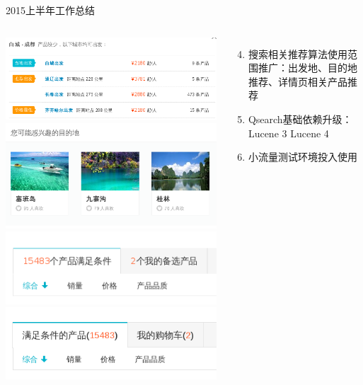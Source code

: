 \documentclass{beamer}
\begin{document}
\begin{CJK}{UTF8}{gbsn}
\begin{frame}{2015上半年工作总结}
  \begin{columns}
    \begin{center}
      \begin{minipage}[b]{1\textwidth}
         {
          \includegraphics[scale=0.2]{./images/dep-recommend}\\
          \includegraphics[scale=0.2]{./images/dest-recommend}
        }
         {
          \includegraphics[scale=0.4]{./images/a}\\
          \includegraphics[scale=0.4]{./images/b}
        }
      \end{minipage}
    \end{center}
    \begin{enumerate}\setcounter{enumi}{3}
      \item<1-> 搜索相关推荐算法使用范围推广：出发地、目的地推荐、详情页相关产品推荐
      \item<2-> Qsearch基础依赖升级：Lucene 3  Lucene 4
      \item<3-> 小流量测试环境投入使用
    \end{enumerate}
  \end{columns}
\end{frame}



\end{CJK}
\end{document}
